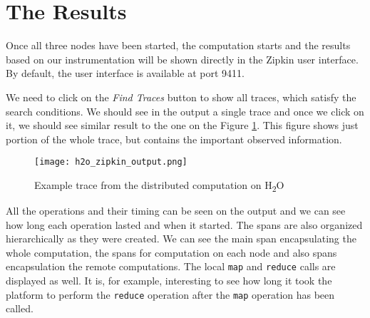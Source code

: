 \section{The Results}
Once all three nodes have been started, the computation starts and the results based on our instrumentation will be shown directly in the Zipkin user interface. By default, the user interface is available at port 9411.

We need to click on the \textit{Find Traces} button to show all traces, which satisfy the search conditions. We should see in the output a single trace and once we click on it, we should see similar result to the one on the Figure \ref{h2o_zipkin_output}. This figure shows just portion of the whole trace, but contains the important observed information.
	\begin{figure}
		\centering
		\texttt{[image: h2o\_zipkin\_output.png]}
		\caption{Example trace from the distributed computation on H\textsubscript{2}O}
		\label{h2o_zipkin_output}
	\end{figure}

All the operations and their timing can be seen on the output and we can see how long each operation lasted and when it started. The spans are also organized hierarchically as they were created. We can see the main span encapsulating the whole computation, the spans for computation on each node and also spans encapsulation the remote computations. The local \texttt{map} and \texttt{reduce} calls are displayed as well. It is, for example, interesting to see how long it took the platform to perform the \texttt{reduce} operation after the \texttt{map} operation has been called.